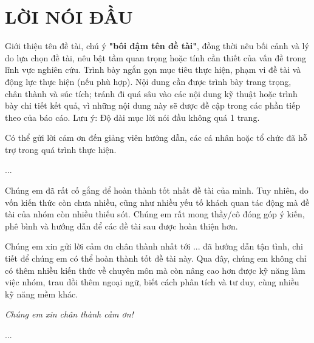 \section*{LỜI NÓI ĐẦU}
{}

Giới thiệu tên đề tài, chú ý \textbf{"bôi đậm tên đề tài"}, đồng thời nêu bối cảnh và lý do lựa chọn đề tài, nêu bật tầm quan trọng hoặc tính cần thiết của vấn đề trong lĩnh vực nghiên cứu. Trình bày ngắn gọn mục tiêu thực hiện, phạm vi đề tài và động lực thực hiện (nếu phù hợp). Nội dung cần được trình bày trang trọng, chân thành và súc tích; tránh đi quá sâu vào các nội dung kỹ thuật hoặc trình bày chi tiết kết quả, vì những nội dung này sẽ được đề cập trong các phần tiếp theo của báo cáo. Lưu ý: Độ dài mục lời nói đầu không quá 1 trang.

Có thể gửi lời cảm ơn đến giảng viên hướng dẫn, các cá nhân hoặc tổ chức đã hỗ trợ trong quá trình thực hiện.

...

Chúng em đã rất cố gắng để hoàn thành tốt nhất đề tài của mình. Tuy nhiên, do vốn kiến thức còn chưa nhiều, cũng như nhiều yếu tố khách quan tác động mà đề tài của nhóm còn nhiều thiếu sót. Chúng em rất mong thầy/cô đóng góp ý kiến, phê bình và hướng dẫn để các đề tài sau được hoàn thiện hơn.

Chúng em xin gửi lời cảm ơn chân thành nhất tới ... đã hướng dẫn tận tình, chi tiết để chúng em có thể hoàn thành tốt đề tài này. Qua đây, chúng em không chỉ có thêm nhiều kiến thức về chuyên môn mà còn nâng cao hơn được kỹ năng làm việc nhóm, trau dồi thêm ngoại ngữ, biết cách phân tích và tư duy, cùng nhiều kỹ năng mềm khác.

\begin{flushright}
    \noindent\textit{Chúng em xin chân thành cảm ơn!}
\end{flushright}

...

\newpage
\cleardoublepage